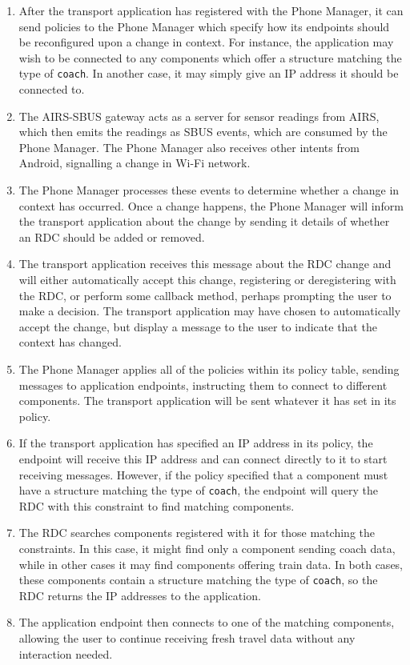 \documentclass[12pt,twoside,notitlepage]{report}
\begin{document}
\begin{enumerate}

\item After the transport application has registered with the Phone Manager, it can send policies to the Phone Manager which specify how its endpoints should be reconfigured upon a change in context. For instance, the application may wish to be connected to any components which offer a structure matching the type of {\tt coach}. In another case, it may simply give an IP address it should be connected to.

\item The AIRS-SBUS gateway acts as a server for sensor readings from AIRS, which then emits the readings as SBUS events, which are consumed by the Phone Manager. The Phone Manager also receives other intents from Android, signalling a change in Wi-Fi network.

\item The Phone Manager processes these events to determine whether a change in context has occurred. Once a change happens, the Phone Manager will inform the transport application about the change by sending it details of whether an RDC should be added or removed. 

\item The transport application receives this message about the RDC change and will either automatically accept this change, registering or deregistering with the RDC, or perform some callback method, perhaps prompting the user to make a decision. The transport application may have chosen to automatically accept the change, but display a message to the user to indicate that the context has changed.

\item The Phone Manager applies all of the policies within its policy table, sending messages to application endpoints, instructing them to connect to different components. The transport application will be sent whatever it has set in its policy.

\item If the transport application has specified an IP address in its policy, the endpoint will receive this IP address and can connect directly to it to start receiving messages. However, if the policy specified that a component must have a structure matching the type of {\tt coach}, the endpoint will query the RDC with this constraint to find matching components.

\item The RDC searches components registered with it for those matching the constraints. In this case, it might find only a component sending coach data, while in other cases it may find components offering train data. In both cases, these components contain a structure matching the type of {\tt coach}, so the RDC returns the IP addresses to the application.

\item The application endpoint then connects to one of the matching components, allowing the user to continue receiving fresh travel data without any interaction needed.

\end{enumerate}
\end{document}
